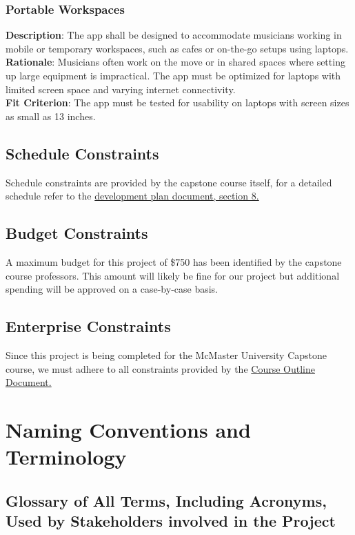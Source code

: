 \documentclass[12pt]{article}
\begin{document}
\subsubsection*{Portable Workspaces}
\textbf{Description}: The app shall be designed to accommodate musicians working in mobile or temporary workspaces, such as cafes or on-the-go setups using laptops.\\
\textbf{Rationale}: Musicians often work on the move or in shared spaces where setting up large equipment is impractical. The app must be optimized for laptops with limited screen space and varying internet connectivity.\\
\textbf{Fit Criterion}: The app must be tested for usability on laptops with screen sizes as small as 13 inches.

\subsection{Schedule Constraints}
Schedule constraints are provided by the capstone course itself, for a detailed schedule refer to the \href{https://github.com/emilyperica/ScoreGen/blob/main/docs/DevelopmentPlan/DevelopmentPlan.pdf}{development plan document, section 8.}
\subsection{Budget Constraints}
A maximum budget for this project of \$750 has been identified by the capstone course professors. This amount will likely be fine for our project but additional spending will be approved on a case-by-case basis.
\subsection{Enterprise Constraints}
Since this project is being completed for the McMaster University Capstone course, we must adhere to all constraints provided by the \href{https://gitlab.cas.mcmaster.ca/courses/capstone/-/blob/main/CourseOutline/Capstone_Outline.pdf}{Course Outline Document.}
\section{Naming Conventions and Terminology}
\subsection{Glossary of All Terms, Including Acronyms, Used by Stakeholders
involved in the Project}
\end{document}
